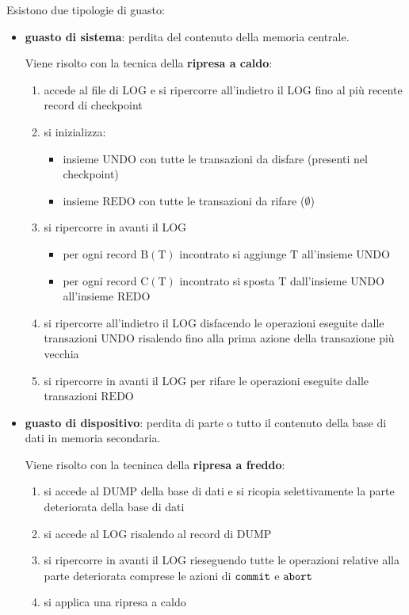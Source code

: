 Esistono due tipologie di guasto:
\begin{itemize}[label=$\triangleright$, itemsep=\medskipamount]
  \item \textbf{guasto di sistema}: perdita del contenuto della memoria centrale.
  
  Viene risolto con la tecnica della \textcolor{azzurrino}{\textbf{ripresa a caldo}}:
  \begin{enumerate}[itemsep=\smallskipamount]
    \item accede al file di LOG e si ripercorre all’indietro il LOG fino al più recente record di checkpoint
    \item si inizializza:
    \begin{itemize}[label=$\diamond$, itemsep=\smallskipamount]
      \item insieme $\mathrm{UNDO}$ con tutte le transazioni da disfare (presenti nel checkpoint)
      \item insieme $\mathrm{REDO}$ con tutte le transazioni da rifare ($\emptyset$)
    \end{itemize}
    \item si ripercorre in avanti il LOG
    \begin{itemize}[label=$\circ$, itemsep=\smallskipamount]
      \item per ogni record $\mathrm{B(T)}$ incontrato si aggiunge $\mathrm{T}$ all’insieme $\mathrm{UNDO}$
      \item per ogni record $\mathrm{C(T)}$ incontrato si sposta $\mathrm{T}$ dall’insieme $\mathrm{UNDO}$ all’insieme $\mathrm{REDO}$
    \end{itemize}
    \item si ripercorre all'indietro il LOG disfacendo le operazioni eseguite dalle transazioni $\mathrm{UNDO}$ risalendo fino alla prima azione della transazione più vecchia
    \item si ripercorre in avanti il LOG per rifare le operazioni eseguite dalle transazioni $\mathrm{REDO}$
  \end{enumerate}
  \item \textbf{guasto di dispositivo}: perdita di parte o tutto il contenuto della base di dati in memoria secondaria.
  
  Viene risolto con la tecninca della \textcolor{azzurrino}{\textbf{ripresa a freddo}}:
  \begin{enumerate}[itemsep=\smallskipamount]
    \item si accede al $\mathrm{DUMP}$ della base di dati e si ricopia selettivamente la parte deteriorata della base di dati
    \item si accede al LOG risalendo al record di $\mathrm{DUMP}$
    \item si ripercorre in avanti il LOG rieseguendo tutte le operazioni relative alla parte deteriorata comprese le azioni di $\verb|commit|$ e $\verb|abort|$
    \item si applica una ripresa a caldo
  \end{enumerate}
\end{itemize}

